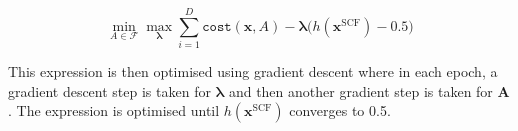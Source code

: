 \begin{equation} \label{eq:lagrange}
	\min_{A \in \mathcal{F}} \max_{\boldsymbol{\lambda}} \sum_{i=1}^D \texttt{cost}(\mathbf{x}, A) - \boldsymbol{\lambda} \bigg( h(\mathbf{x}^{\text{SCF}}) - 0.5\bigg)
\end{equation}

This expression is then optimised using gradient descent where in each epoch, a gradient descent step is taken for $\boldsymbol{\lambda}$ and then another gradient step is taken for $\mathbf{A}$. The expression is optimised until $h(\mathbf{x}^{\text{SCF}})$ converges to 0.5.